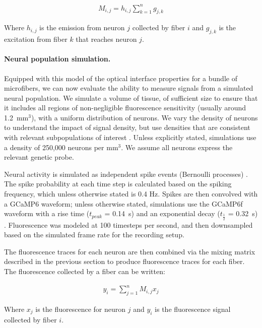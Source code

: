 \begin{align}
M_{i, j} = h_{i, j} \sum_{k = 1}^n g_{j, k}	
\end{align}


Where $h_{i, j}$ is the emission from neuron $j$ collected by fiber $i$ and $g_{j, k}$ is the excitation from fiber $k$ that reaches neuron $j$.

\paragraph{Neural population simulation.} Equipped with this model of the optical interface properties for a bundle of microfibers, we can now evaluate the ability to measure signals from a simulated neural population. We simulate a volume of tissue, of sufficient size to ensure that it includes all regions of non-negligible fluorescence sensitivity (usually around 1.2~mm$^3$), with a uniform distribution of neurons. We vary the density of neurons to understand the impact of signal density, but use densities that are consistent with relevant subpopulations of interest \cite{Walton:2012fj,KosubekLanger:2017jb}. Unless explicitly stated, simulations use a density of 250,000 neurons per mm$^3$. We assume all neurons express the relevant genetic probe.

Neural activity is simulated as independent spike events (Bernoulli processes) \cite{Kass2014}. The spike probability at each time step is calculated based on the spiking frequency, which unless otherwise stated is 0.4 Hz. Spikes are then convolved with a GCaMP6 waveform; unless otherwise stated, simulations use the GCaMP6f waveform with a rise time ($t_{peak}$ = 0.14~s) and an exponential decay ($t_{\frac{1}{2}}$ = 0.32~s) \cite{Chen:2013fc}. Fluorescence was modeled at 100 timesteps per second, and then downsampled based on the simulated frame rate for the recording setup.

The fluorescence traces for each neuron are then combined via the mixing matrix described in the previous section to produce fluorescence traces for each fiber. The fluorescence collected by a fiber can be written:

\begin{align}
y_i = \sum_{j = 1}^{n} M_{i, j} x_j
\end{align}

Where $x_j$ is the fluorescence for neuron $j$ and $y_i$ is the fluorescence signal collected by fiber $i$.

